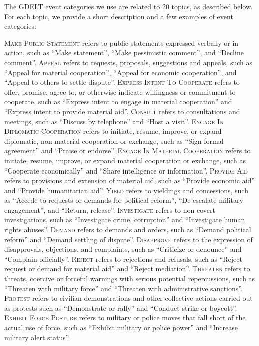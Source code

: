 \documentclass{bmcart}
\begin{document}
The GDELT event categories we use are related to 20 topics, as described below. For each topic, we provide a short description and a few examples of event categories:

{\scshape Make Public Statement} refers to public statements expressed verbally or in action, such as ``Make statement'', ``Make pessimistic comment'', and ``Decline comment''.
{\scshape Appeal} refers to requests, proposals, suggestions and appeals, such as ``Appeal for material cooperation'', ``Appeal for economic cooperation'', and ``Appeal to others to settle dispute''.
{\scshape Express Intent To Cooperate} refers to offer, promise, agree to, or otherwise indicate willingness or commitment to cooperate, such as ``Express intent to engage in material cooperation'' and ``Express intent to provide material aid''.
{\scshape Consult} refers to consultations and meetings, such as ``Discuss by telephone'' and ``Host a visit''.
{\scshape Engage In Diplomatic Cooperation} refers to initiate, resume, improve, or expand diplomatic, non-material cooperation or exchange, such as ``Sign formal agreement'' and ``Praise or endorse''.
{\scshape Engage In Material Cooperation} refers to initiate, resume, improve, or expand material cooperation or exchange, such as ``Cooperate economically'' and ``Share intelligence or information''.
{\scshape Provide Aid} refers to provisions and extension of material aid, such as ``Provide economic aid'' and ``Provide humanitarian aid''.
{\scshape Yield} refers to yieldings and concessions, such as ``Accede to requests or demands for political reform'', ``De-escalate military engagement'', and ``Return, release''.
{\scshape Investigate} refers to non-covert investigations, such as  ``Investigate crime, corruption'' and ``Investigate human rights abuses''.
{\scshape Demand} refers to demands and orders, such as ``Demand political reform'' and ``Demand settling of dispute''.
{\scshape Disapprove} refers to the expression of disapprovals, objections, and complaints, such as ``Criticize or denounce'' and ``Complain officially''.
{\scshape Reject} refers to rejections and refusals, such as ``Reject request or demand for material aid'' and ``Reject mediation''.
{\scshape Threaten} refers to threats, coercive or forceful warnings with serious potential repercussions, such as ``Threaten with military force'' and ``Threaten with administrative sanctions''.
{\scshape Protest} refers to civilian demonstrations and other collective actions carried out as
protests such as ``Demonstrate or rally'' and ``Conduct strike or boycott''.
{\scshape Exhibit Force Posture} refers to military or police moves that fall short of the actual use of force, such as ``Exhibit military or police power'' and ``Increase military alert status''.
\end{document}
